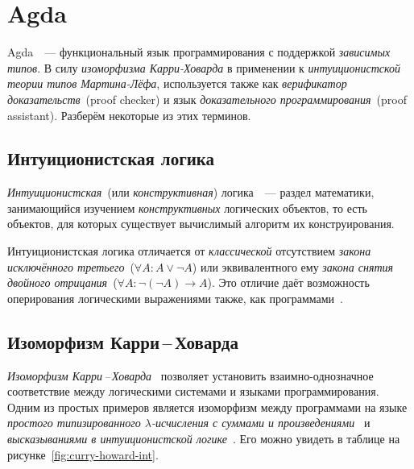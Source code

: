 \section{Agda}

Agda~\cite{agda}~--- функциональный язык программирования с поддержкой
\emph{зависимых типов}. В силу \emph{изоморфизма Карри-Ховарда} в
применении к \emph{интуиционистской теории типов Мартина-Лёфа},
используется также как \emph{верификатор доказательств}~(proof
checker) и язык \emph{доказательного программирования}~(proof assistant).
Разберём некоторые из этих терминов.

\subsection{Интуиционистская логика}

\emph{Интуиционистская}~(или \emph{конструктивная})
логика~\cite{шень2,curryhoward}~--- раздел математики, занимающийся
изучением \emph{конструктивных} логических объектов, то есть объектов,
для которых существует вычислимый алгоритм их конструирования.


Интуиционистская логика отличается от \emph{классической} отсутствием
\emph{закона исключённого третьего}~($\forall A : A \vee \neg A$) или
эквивалентного ему \emph{закона снятия двойного отрицания}~($\forall A
: \neg (\neg A) \to A$). Это отличие даёт возможность оперирования
логическими выражениями также, как программами~\cite{mltt, howard69}.

\subsection{Изоморфизм Карри\,–\,Ховарда}

\emph{Изоморфизм Карри\,--\,Ховарда}~\cite{curryhoward} позволяет
установить взаимно-однозначное соответствие между логическими
системами и языками программирования. Одним из простых примеров
является изоморфизм между программами на языке \emph{простого
  типизированного $\lambda$-исчисления с суммами и
  произведениями}~\cite{curryhoward} и \emph{высказываниями в
  интуиционистской логике}~\cite{curryhoward}. Его можно увидеть в
таблице на рисунке~\ref{fig:curry-howard-int}. 

